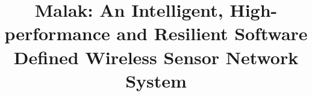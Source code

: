 \documentclass{sig-alternate}
\newcommand{\sdn}{Malak}
\begin{document}
\title{{\sdn}: An Intelligent, High-performance and Resilient Software Defined Wireless Sensor Network System}
\author{}



\maketitle





%






\end{document}
